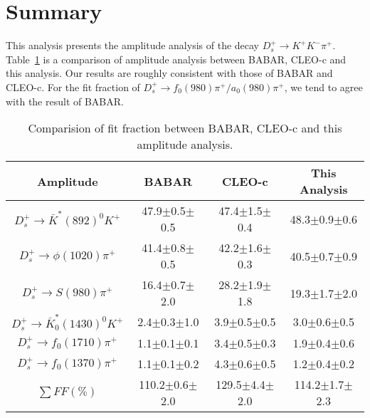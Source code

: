 \section{Summary}
\par{
    This analysis presents the amplitude analysis of the decay $D_{s}^{+} \rightarrow K^{+}K^{-}\pi^{+}$.
    Table~\ref{final-comp} is a comparison of amplitude analysis between BABAR, CLEO-c and this analysis. Our results are roughly consistent with those of BABAR and CLEO-c.
    For the fit fraction of $D_{s}^{+} \rightarrow f_{0}(980)\pi^{+}/a_{0}(980)\pi^{+}$, we tend to agree with the result of BABAR.
    \begin{table}[htbp]
        \caption{Comparision of fit fraction between BABAR, CLEO-c and this amplitude analysis.}
        \label{final-comp}
        \begin{center}
            \begin{tabular}{cccc}
                \toprule\toprule
                Amplitude & BABAR  & CLEO-c  & This Analysis\\
                \hline
                $D_{s}^{+} \rightarrow \bar{K}^{*}(892)^{0}K^{+}$              & 47.9$\pm$0.5$\pm$0.5  & 47.4$\pm$1.5$\pm$0.4& 48.3$\pm$0.9$\pm$0.6 \\
                $D_{s}^{+} \rightarrow \phi(1020)\pi^{+}$                      & 41.4$\pm$0.8$\pm$0.5  & 42.2$\pm$1.6$\pm$0.3& 40.5$\pm$0.7$\pm$0.9 \\
                $D_{s}^{+} \rightarrow S(980)\pi^{+}$    & 16.4$\pm$0.7$\pm$2.0  & 28.2$\pm$1.9$\pm$1.8& 19.3$\pm$1.7$\pm$2.0 \\
                $D_{s}^{+} \rightarrow \bar{K}^{*}_{0}(1430)^{0}K^{+}$         & 2.4$\pm$0.3$\pm$1.0   & 3.9$\pm$0.5$\pm$0.5 & 3.0$\pm$0.6$\pm$0.5  \\
                $D_{s}^{+} \rightarrow f_{0}(1710)\pi^{+}$                     & 1.1$\pm$0.1$\pm$0.1   & 3.4$\pm$0.5$\pm$0.3 & 1.9$\pm$0.4$\pm$0.6  \\
                $D_{s}^{+} \rightarrow f_{0}(1370)\pi^{+}$                     & 1.1$\pm$0.1$\pm$0.2   & 4.3$\pm$0.6$\pm$0.5 & 1.2$\pm$0.4$\pm$0.2  \\
                $\begin{matrix}\sum FF(\%)\end{matrix}$                          & 110.2$\pm$0.6$\pm$2.0 & 129.5$\pm$4.4$\pm$2.0 & 114.2$\pm$1.7$\pm$2.3\\

\end{tabular}
\end{center}
\end{table}}
